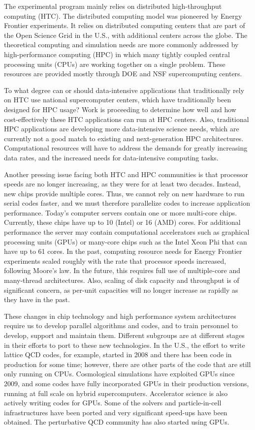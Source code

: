 The experimental program mainly relies on distributed
high-throughput computing (HTC). 
The distributed computing model was pioneered by Energy Frontier
experiments.  It relies on distributed computing
centers that are part of the Open Science Grid in the U.S.,
with additional centers across the globe. 
The theoretical computing and simulation needs are more commonly
addressed by high-performance computing (HPC) in which many
tightly coupled central processing units (CPUs) are working together on a single
problem. These resources are provided mostly through DOE and NSF
supercomputing centers.

To what degree can or should data-intensive applications that traditionally 
rely on HTC use national supercomputer centers, which have traditionally 
been designed for HPC usage?
Work is proceeding to determine how well and how cost-effectively these HTC
applications can run at HPC centers.
Also, traditional HPC applications are developing more data-intensive
science needs, which are currently not a good match to existing
and next-generation HPC architectures. Computational resources will have to
address the demands for greatly increasing data rates, and the increased
needs for data-intensive computing tasks.

Another pressing issue facing both HTC and HPC communities is that
processor speeds are no longer increasing, as they were for
at least two decades. Instead, new chips provide multiple
cores. Thus, we cannot rely on new hardware to run serial codes faster, and
we must therefore parallelize codes to increase application performance. 
Today's computer servers contain one or more multi-core chips.  Currently,
these chips  have up to 10 (Intel) or 16 (AMD) cores. 
For additional performance the server may contain
computational accelerators such as graphical processing
units (GPUs) or many-core chips such as the Intel Xeon Phi that can have up
to 61 cores. 
In the past, computing resource needs for Energy Frontier experiments scaled
roughly with the rate that processor speeds increased, following Moore's
law. In the future, this requires full use of multiple-core and many-thread 
architectures. Also,
scaling of disk capacity and throughput is of
significant concern, as per-unit capacities will no longer increase as rapidly
as they have in the past.

These changes in chip technology and high performance system architectures
require us to develop parallel algorithms and codes, and to train personnel
to develop, support and maintain them. Different subgroups are at different
stages in their efforts to port to these new technologies. 
In the U.S., the effort to write lattice QCD codes, for
example, started in 2008 and there has been code in
production for some time; however, there
are other parts of the code that are still only running on CPUs.
Cosmological simulations have exploited GPUs since 2009, and some 
codes have fully incorporated GPUs in their production versions, running 
at full scale on hybrid supercomputers.
Accelerator science is also actively writing codes for GPUs. Some of the
solvers and particle-in-cell infrastructures have been ported and very
significant speed-ups have been obtained. The perturbative QCD community
has also started using GPUs.

